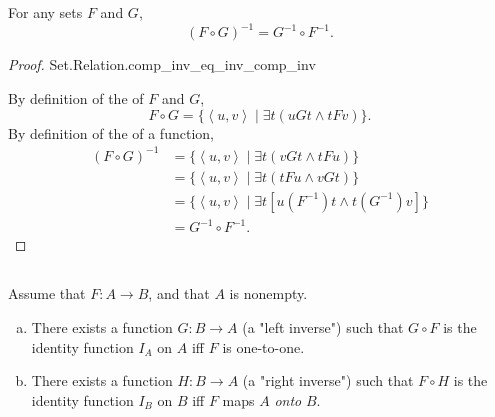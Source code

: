 \documentclass{report}
\begin{document}
\subsection{}%
\label{sub:theorem-3i}

\begin{theorem}[3I]

  For any sets $F$ and $G$, $$(F \circ G)^{-1} = G^{-1} \circ F^{-1}.$$

\end{theorem}

\begin{proof}

    {Set.Relation.comp\_inv\_eq\_inv\_comp\_inv}

  By definition of the  of $F$ and $G$,
    $$F \circ G = \{\left< u, v \right> \mid \exists t(uGt \land tFv)\}.$$
  By definition of the  of a function,
    \begin{align*}
      (F \circ G)^{-1}
        & = \{\left< u, v \right> \mid \exists t (vGt \land tFu)\} \\
        & = \{\left< u, v \right> \mid \exists t (tFu \land vGt)\} \\
        & = \{\left< u, v \right> \mid
          \exists t \left[ u(F^{-1})t \land t(G^{-1})v \right]\} \\
        & = G^{-1} \circ F^{-1}.
    \end{align*}

\end{proof}

\subsection{}%
\label{sub:theorem-3j}

\begin{theorem}[3J]

  Assume that $F \colon A \rightarrow B$, and that $A$ is nonempty.
  \begin{enumerate}[(a)]
    \item There exists a function $G \colon B \rightarrow A$ (a "left inverse")
      such that $G \circ F$ is the identity function $I_A$ on $A$ iff $F$ is
      one-to-one.
    \item There exists a function $H \colon B \rightarrow A$ (a "right inverse")
      such that $F \circ H$ is the identity function $I_B$ on $B$ iff $F$ maps
      $A$ \textit{onto} $B$.
  \end{enumerate}

\end{theorem}
\end{document}
